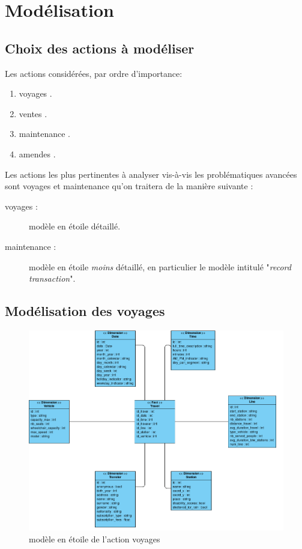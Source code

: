 \documentclass[a4paper,12pt]{report}
\begin{document}
\chapter{Modélisation}
\section{Choix des actions à modéliser}
Les actions considérées, par ordre d'importance:
\begin{enumerate}
  \item \og voyages \fg.
  \item \og ventes \fg.
  \item \og maintenance \fg.
  \item \og amendes \fg.
\end{enumerate}

Les actions les plus pertinentes à analyser vis-à-vis les problématiques avancées sont \og voyages \fg et \og maintenance \fg qu'on traitera de la manière suivante :
\begin{description}
  \item [voyages :] modèle en étoile détaillé.
  \item [maintenance :] modèle en étoile \textit{moins} détaillé, en particulier le modèle intitulé "\textit{record transaction}".
\end{description}

\section{Modélisation des voyages}
\begin{figure}[!ht]
  \centering
  \includegraphics[scale=0.4]{images/voyages_datamart.png}
  \caption{modèle en étoile de l'action \og voyages \fg}
\end{figure}
\end{document}
